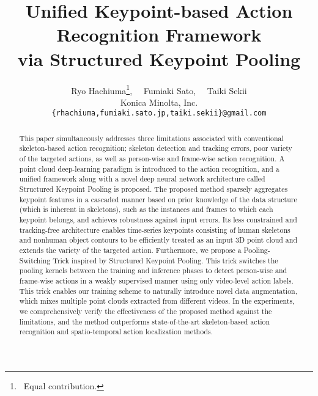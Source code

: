 \documentclass[10pt,twocolumn,letterpaper]{article}
\begin{document}
\title{Unified Keypoint-based Action Recognition Framework \\ via Structured Keypoint Pooling}

\author{
Ryo Hachiuma\thanks{~Equal contribution.}, ~~Fumiaki Sato\footnotemark[1], ~~Taiki Sekii \\
Konica Minolta, Inc. \\
{\tt\small \{rhachiuma,fumiaki.sato.jp,taiki.sekii\}@gmail.com} \\
}



\maketitle

\begin{abstract}
This paper simultaneously addresses three limitations associated with conventional skeleton-based action recognition; skeleton detection and tracking errors, poor variety of the targeted actions, as well as person-wise and frame-wise action recognition.
A point cloud deep-learning paradigm is introduced to the action recognition, and a unified framework along with a novel deep neural network architecture called {\rm Structured Keypoint Pooling} is proposed.
The proposed method sparsely aggregates keypoint features in a cascaded manner based on prior knowledge of the data structure (which is inherent in skeletons), such as the instances and frames to which each keypoint belongs, and achieves robustness against input errors.
Its less constrained and tracking-free architecture enables time-series keypoints consisting of human skeletons and nonhuman object contours to be efficiently treated as an input 3D point cloud and extends the variety of the targeted action.
Furthermore, we propose a {\rm Pooling-Switching Trick} inspired by Structured Keypoint Pooling.
This trick switches the pooling kernels between the training and inference phases to detect person-wise and frame-wise actions in a weakly supervised manner using only video-level action labels.
This trick enables our training scheme to naturally introduce novel data augmentation, which mixes multiple point clouds extracted from different videos.
In the experiments, we comprehensively verify the effectiveness of the proposed method against the limitations, and the method outperforms state-of-the-art skeleton-based action recognition and spatio-temporal action localization methods.
\end{abstract}

\vspace{-5mm}
\end{document}
